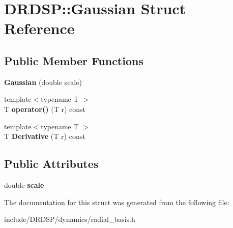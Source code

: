 \hypertarget{struct_d_r_d_s_p_1_1_gaussian}{\section{D\-R\-D\-S\-P\-:\-:Gaussian Struct Reference}
\label{struct_d_r_d_s_p_1_1_gaussian}
}
\subsection*{Public Member Functions}
\begin{DoxyCompactItemize}
\item 
\hypertarget{struct_d_r_d_s_p_1_1_gaussian_a3d61313f311f90c60eb62b018070639d}{{\bfseries Gaussian} (double scale)}\label{struct_d_r_d_s_p_1_1_gaussian_a3d61313f311f90c60eb62b018070639d}

\item 
\hypertarget{struct_d_r_d_s_p_1_1_gaussian_a1c0444ae1885798056899ca65f1f7c70}{{\footnotesize template$<$typename T $>$ }\\T {\bfseries operator()} (T r) const }\label{struct_d_r_d_s_p_1_1_gaussian_a1c0444ae1885798056899ca65f1f7c70}

\item 
\hypertarget{struct_d_r_d_s_p_1_1_gaussian_a2d44cfc87bff3ab7af32d69ad8d6dfa8}{{\footnotesize template$<$typename T $>$ }\\T {\bfseries Derivative} (T r) const }\label{struct_d_r_d_s_p_1_1_gaussian_a2d44cfc87bff3ab7af32d69ad8d6dfa8}

\end{DoxyCompactItemize}
\subsection*{Public Attributes}
\begin{DoxyCompactItemize}
\item 
\hypertarget{struct_d_r_d_s_p_1_1_gaussian_a54c0ec40d9295e0167e6216912f01d2a}{double {\bfseries scale}}\label{struct_d_r_d_s_p_1_1_gaussian_a54c0ec40d9295e0167e6216912f01d2a}

\end{DoxyCompactItemize}


The documentation for this struct was generated from the following file\-:\begin{DoxyCompactItemize}
\item 
include/\-D\-R\-D\-S\-P/dynamics/radial\-\_\-basis.\-h\end{DoxyCompactItemize}
